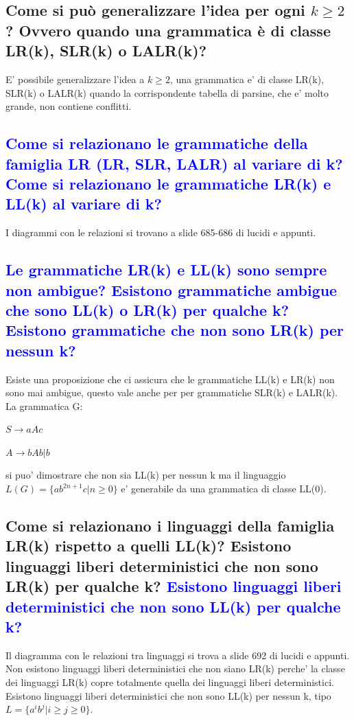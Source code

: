 \documentclass{article}
\begin{document}
    \subsection{Come si può generalizzare l'idea per ogni $k \geq 2$? Ovvero quando una grammatica è di classe LR(k), SLR(k) o LALR(k)? }
    E' possibile generalizzare l'idea a $k \geq 2$, una grammatica e' di classe
    LR(k), SLR(k) o LALR(k) quando la corrispondente tabella di parsine, che e'
    molto grande, non contiene conflitti.
    \subsection{\textcolor{blue}{Come si relazionano le grammatiche della famiglia LR (LR, SLR, LALR) al variare di k?
            Come si relazionano le grammatiche LR(k) e LL(k) al variare di k?}}
    I diagrammi con le relazioni si trovano a slide 685-686 di lucidi e appunti.
    \subsection{\textcolor{blue}{Le grammatiche LR(k) e LL(k) sono sempre non ambigue?
            Esistono grammatiche ambigue che sono LL(k) o LR(k) per qualche k?
            Esistono grammatiche che non sono LR(k) per nessun k?}}
    Esiste una proposizione che ci assicura che le grammatiche LL(k) e LR(k) non
    sono mai ambigue, questo vale anche per per grammatiche SLR(k) e LALR(k). La
    grammatica G:
    \begin{center}
        $S \to aAc$

        $A \to bAb| b$
    \end{center}

    si puo' dimostrare che non sia LL(k) per nessun k ma il linguaggio
$L(G)=\{ab^{2n+1}c|n\geq 0\}$ e' generabile da una grammatica di classe LL(0).

    \subsection{Come si relazionano i linguaggi della famiglia LR(k) rispetto a quelli LL(k)?
        Esistono linguaggi liberi deterministici che non sono LR(k) per qualche k? \textcolor{blue}{Esistono linguaggi liberi deterministici che non sono LL(k) per qualche k?}}
    Il diagramma con le relazioni tra linguaggi si trova a slide 692 di lucidi e
    appunti. Non esistono linguaggi liberi deterministici che non siano LR(k)
    perche' la classe dei linguaggi LR(k) copre totalmente quella dei linguaggi
    liberi deterministici. Esistono linguaggi liberi deterministici che non sono
    LL(k) per nessun k, tipo $L=\{a^ib^j|i\geq j\geq 0\}$.
\end{document}
